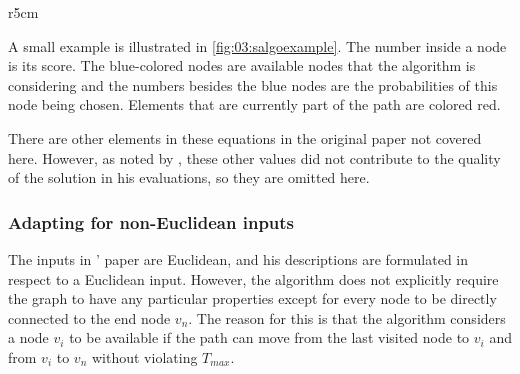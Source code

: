 \begin{wrapfigure}{r}{5cm}
    \centering
    \caption{The S-Algorithm at work.}
    \label{fig:03:salgoexample}
\end{wrapfigure}

A small example is illustrated in \cref{fig:03:salgoexample}.
The number inside a node is its score. 
The blue-colored nodes are available nodes that the algorithm is considering and the numbers besides the blue nodes are the probabilities of this node being chosen.
Elements that are currently part of the path are colored red.

There are other elements in these equations in the original paper not covered here.
However, as noted by \citeauthor{tsiligiridis_heuristic_1984}, these other values did not contribute to the quality of the solution in his evaluations, so they are omitted here. 

\subsubsection{Adapting for non-Euclidean inputs}

The inputs in \citeauthor{tsiligiridis_heuristic_1984}' paper are Euclidean, and his descriptions are formulated in respect to a Euclidean input.
However, the algorithm does not explicitly require the graph to have any particular properties except for every node to be directly connected to the end node $v_n$.
The reason for this is that the algorithm considers a node $v_i$ to be available if the path can move from the last visited node to $v_i$ and from $v_i$ to $v_n$ without violating $T_{max}$.

